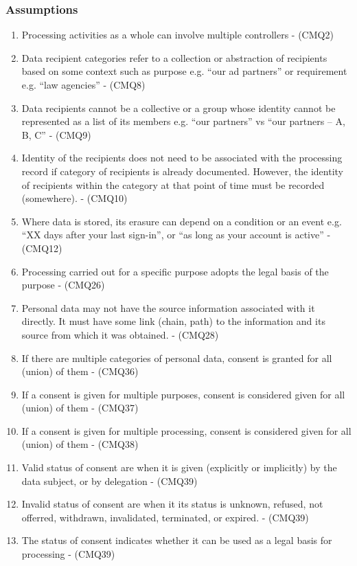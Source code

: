 \subsubsection{Assumptions}
\begin{enumerate}[label={\textit{A.\theenumi}}]
    \item Processing activities as a whole can involve multiple controllers - (CMQ2)
    \item Data recipient categories refer to a collection or abstraction of recipients based on some context such as purpose e.g. “our ad partners” or requirement e.g. “law agencies” - (CMQ8)
    \item Data recipients cannot be a collective or a group whose identity cannot be represented as a list of its members e.g. “our partners” vs “our partners – A, B, C” - (CMQ9)
    \item Identity of the recipients does not need to be associated with the processing record if category of recipients is already documented. However, the identity of recipients within the category at that point of time must be recorded (somewhere). - (CMQ10)
    \item Where data is stored, its erasure can depend on a condition or an event e.g. “XX days after your last sign-in”, or “as long as your account is active” - (CMQ12)
    \item Processing carried out for a specific purpose adopts the legal basis of the purpose - (CMQ26)
    \item Personal data may not have the source information associated with it directly. It must have some link (chain, path) to the information and its source from which it was obtained. - (CMQ28)
    \item If there are multiple categories of personal data, consent is granted for all (union) of them - (CMQ36)
    \item If a consent is given for multiple purposes, consent is considered given for all (union) of them - (CMQ37)
    \item If a consent is given for multiple processing, consent is considered given for all (union) of them - (CMQ38)
    \item Valid status of consent are when it is given (explicitly or implicitly) by the data subject, or by delegation - (CMQ39)
    \item Invalid status of consent are when it its status is unknown, refused, not offerred, withdrawn, invalidated, terminated, or expired. - (CMQ39)
    \item The status of consent indicates whether it can be used as a legal basis for processing - (CMQ39)

\end{enumerate}

